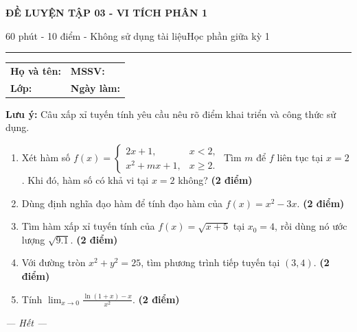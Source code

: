 \documentclass[11pt,a4paper]{article}
\newcommand{\examtitle}[4]{\begin{center}{\Large\bfseries\color{hcmusblue}#1}\par\vspace{3pt}{\large\bfseries #2}\par\vspace{3pt}\small #3\quad\textbullet\quad #4\end{center}\vspace{5pt}\hrule\vspace{8pt}}
\newcommand{\studentline}{\begin{tabularx}{\textwidth}{X X}\textbf{Họ và tên:} \hrulefill & \textbf{MSSV:} \hrulefill\\[7pt]\textbf{Lớp:} \hrulefill & \textbf{Ngày làm:} \hrulefill\end{tabularx}\vspace{8pt}}
\newcommand{\points}[1]{\hfill\textbf{(#1 điểm)}}
\begin{document}
\examtitle{ĐỀ LUYỆN TẬP 03 - VI TÍCH PHÂN 1}{VI TÍCH PHÂN 1 - HCMUS (bộ luyện tập)}{60 phút - 10 điểm - Không sử dụng tài liệu}{Học phần giữa kỳ 1}

\studentline
\begin{notebox}\textbf{Lưu ý:} Câu xấp xỉ tuyến tính yêu cầu nêu rõ điểm khai triển và công thức sử dụng.\end{notebox}
\begin{enumerate}
\item Xét hàm số $f(x)=\begin{cases}2x+1,&x<2,\\x^2+mx+1,&x\ge2.\end{cases}$ Tìm $m$ để $f$ liên tục tại $x=2$. Khi đó, hàm số có khả vi tại $x=2$ không? \points{2}
\item Dùng định nghĩa đạo hàm để tính đạo hàm của $f(x)=x^2-3x$. \points{2}
\item Tìm hàm xấp xỉ tuyến tính của $f(x)=\sqrt{x+5}$ tại $x_0=4$, rồi dùng nó ước lượng $\sqrt{9.1}$. \points{2}
\item Với đường tròn $x^2+y^2=25$, tìm phương trình tiếp tuyến tại $(3,4)$. \points{2}
\item Tính $\displaystyle\lim_{x\to0}\frac{\ln(1+x)-x}{x^2}$. \points{2}
\end{enumerate}
\vfill\begin{center}\textit{--- Hết ---}\end{center}
\end{document}

